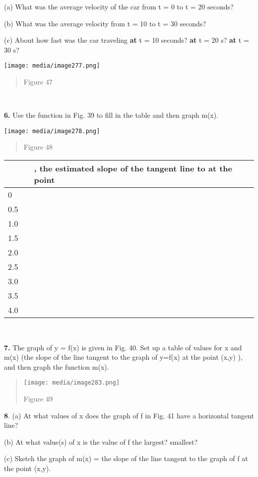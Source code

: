 (a) What was the average velocity of the car from t = 0 to t = 20
seconds?

(b) What was the average velocity from t = 10 to t = 30 seconds?

(c) About how fast was the car traveling \textbf{at} t = 10 seconds?
\textbf{at} t = 20 s? \textbf{at} t = 30 s?

\texttt{[image: media/image277.png]}

\begin{quote}
Figure 47
\end{quote}

\textbf{\\
}

\textbf{6.} Use the function in Fig. 39 to fill in the table and then
graph m(x).

\texttt{[image: media/image278.png]}

\begin{quote}
Figure 48
\end{quote}

\begin{longtable}[]{@{}lll@{}}
\toprule
& & , the estimated slope of the tangent line to at the
point\tabularnewline
\midrule
\endhead
0 & &\tabularnewline
0.5 & &\tabularnewline
1.0 & &\tabularnewline
1.5 & &\tabularnewline
2.0 & &\tabularnewline
2.5 & &\tabularnewline
3.0 & &\tabularnewline
3.5 & &\tabularnewline
4.0 & &\tabularnewline
\bottomrule
\end{longtable}

\textbf{\\
}

\textbf{7.} The graph of y = f(x) is given in Fig. 40. Set up a table of
values for x and m(x) (the slope of the line tangent to the graph of
y=f(x) at the point (x,y) ), and then graph the function m(x).

\begin{quote}
\texttt{[image: media/image283.png]}

Figure 49
\end{quote}

\textbf{8}. (a) At what values of x does the graph of f in Fig. 41 have
a horizontal tangent line?

(b) At what value(s) of x is the value of f the largest? smallest?

(c) Sketch the graph of m(x) = the slope of the line tangent to the
graph of f at the point (x,y).

